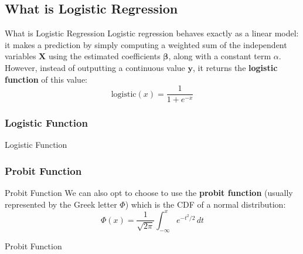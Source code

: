 \subsection{What is Logistic Regression}
\begin{frame}{What is Logistic Regression}
    Logistic regression behaves exactly as a linear model:
    it makes a prediction by simply computing a weighted sum of the
    independent variables $\mathbf{X}$ using the estimated coefficients $\boldsymbol{\beta}$,
    along with a constant term $\alpha$.
    However, instead of outputting a continuous value $\mathbf{y}$,
    it returns the \textbf{logistic function} of this value:
    $$
        \text{logistic}(x) = \frac{1}{1 + e^{-x}}
    $$
\end{frame}


\subsubsection{Logistic Function}

\begin{frame}{Logistic Function}
\end{frame}

\subsubsection{Probit Function}
\begin{frame}{Probit Function}
    We can also opt to choose to use the \textbf{probit function}
    (usually represented by the Greek letter $\Phi$)
    which is the CDF of a normal distribution:
    $$
        \Phi (x)= \frac {1}{\sqrt {2 \pi}}\int _{-\infty }^{x}e^{-t^{2}/2}\,dt
    $$
\end{frame}

\begin{frame}{Probit Function}
\end{frame}

